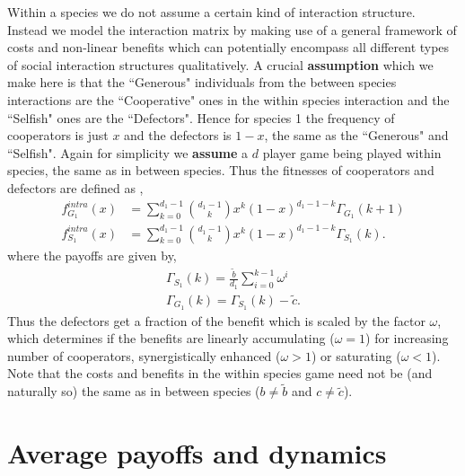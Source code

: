 \documentclass{pnastwo}
\begin{document}
\begin{article}
Within a species we do not assume a certain kind of interaction structure.
Instead we model the interaction matrix by making use of a general framework of costs and non-linear benefits \cite{eshel:AmNat:1988,hauert:JTB:2006a} which can potentially encompass all different types of social interaction structures qualitatively.
A crucial \textbf{assumption} which we make here is that the ``Generous" individuals from the between species interactions are the ``Cooperative" ones in the within species interaction and the ``Selfish" ones are the ``Defectors".
Hence for species 1 the frequency of cooperators is just $x$ and the defectors is $1-x$, the same as the ``Generous" and ``Selfish".
Again for simplicity we \textbf{assume} a $d$ player game being played within species, the same as in between species.
Thus the fitnesses of cooperators and defectors are defined as \cite{hauert:JTB:2006a},
%
\begin{align}
	f^{intra}_{G_1} (x) &= \sum_{k=0}^{d_1 -1} \binom{d_1 -1}{k}x^k (1-x)^{d_1 -1-k} \Gamma_{G_1}(k+1) \\
	f^{intra}_{S_1} (x) &= \sum_{k=0}^{d_1 -1} \binom{d_1 -1}{k}x^k (1-x)^{d_1 -1-k} \Gamma_{S_1}(k).
\label{intrafiteqs}
\end{align}
%
where the payoffs are given by,
\begin{align}
	\Gamma_{S_1} (k) = \frac{\tilde{b}}{d_1} \sum_{i=0}^{k-1} \omega^i \\
	\Gamma_{G_1} (k) = \Gamma_{S_1} (k) - \tilde{c}.
\label{eqintragamepayoffs}
\end{align}
%
Thus the defectors get a fraction of the benefit which is scaled by the factor $\omega$, which determines if the benefits are linearly accumulating ($\omega=1$) for increasing number of cooperators, synergistically enhanced ($\omega>1$) or saturating ($\omega<1$).
Note that the costs and benefits in the within species game need not be (and naturally so) the same as in between species ($b\neq \tilde{b}$ and $c \neq \tilde{c}$).


\section{Average payoffs and dynamics}


\end{article}
\end{document}
